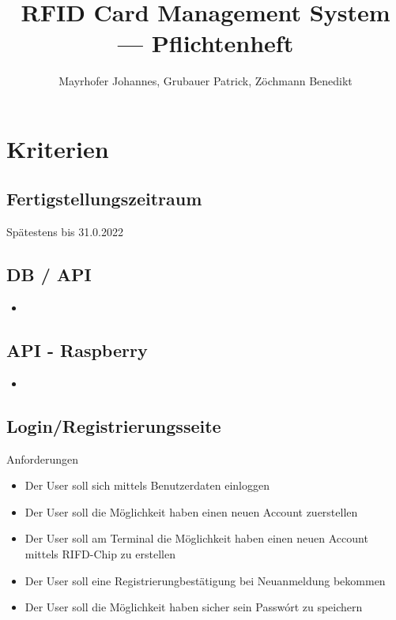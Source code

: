 \documentclass[a4paper]{article}
\title{\Huge{\textbf{RFID Card Management System --- Pflichtenheft}}}
\author{Mayrhofer Johannes, Grubauer Patrick, Zöchmann Benedikt}
\date{\DateCreated}
\begin{document}
\maketitle

\tableofcontents

\newpage
\section{Kriterien}
\subsection{Fertigstellungszeitraum}
Sp\"atestens bis 31.0.2022
\subsection{DB / API}
\begin{itemize}
\item 
\end{itemize}

\subsection{API - Raspberry}
\begin{itemize}
\item 
\end{itemize}

\subsection{Login/Registrierungsseite}
Anforderungen
\begin{itemize}
  \item Der User soll sich mittels Benutzerdaten einloggen
  \item Der User soll die M\"oglichkeit haben einen neuen Account zuerstellen 
  \item Der User soll am Terminal die M\"oglichkeit haben einen neuen Account mittels RIFD-Chip zu erstellen
  \item Der User soll eine Registrierungbest\"atigung bei Neuanmeldung bekommen
  \item Der User soll die M\"oglichkeit haben sicher sein Passw\'ort zu speichern
\end{itemize}
\end{document}
